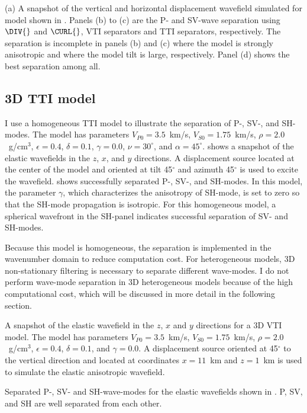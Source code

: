 
{(a) A snapshot of the vertical and horizontal displacement wavefield
simulated for model shown
in .  Panels (b) to (c) are
the P- and SV-wave separation using $\DIV{}$ and $\CURL{}$, VTI
separators and TTI separators, respectively. The separation is
incomplete in panels (b) and (c) where the model is strongly
anisotropic and where the model tilt is large, respectively. Panel (d)
shows the best separation among all.}


\subsection{3D TTI model}
I use a homogeneous TTI model to illustrate the separation of P-,
SV-, and SH-modes. The model has parameters $V_{P0}=3.5$~km/s,
$V_{S0}=1.75$~km/s, $\rho=2.0$~g/cm$^3$, $\epsilon=0.4$, $\delta=0.1$,
$\gamma=0.0$, $\nu=30^\circ$, and
$\alpha=45^\circ$.  shows a snapshot of the
elastic wavefields in the $z$, $x$, and $y$ directions. A displacement
source located at the center of the model and oriented at tilt
45$^\circ$ and azimuth 45$^\circ$ is used to excite the
wavefield.  shows successfully separated P-, SV-, and
SH-modes. In this model, the parameter $\gamma$, which characterizes
the anisotropy of SH-mode, is set to zero so that the SH-mode
propagation is isotropic. For this homogeneous model, a spherical
wavefront in the SH-panel indicates successful separation of SV- and
SH-modes.

Because this model is homogeneous, the separation is implemented in
the wavenumber domain to reduce computation cost. For heterogeneous
models, 3D non-stationary filtering is necessary to separate different
wave-modes. I do not perform wave-mode separation in 3D heterogeneous
models because of the high computational cost, which will be discussed
in more detail in the following section.




{A snapshot of the elastic wavefield in the $z$, $x$ and $y$
directions for a 3D VTI model. The model has parameters
$V_{P0}=3.5$~km/s, $V_{S0}=1.75$~km/s, $\rho=2.0$~g/cm$^3$,
$\epsilon=0.4$, $\delta=0.1$, and $\gamma=0.0$.  A displacement source
oriented at 45$^\circ$ to the vertical direction and located at
coordinates $x=11$~km and $z=1$~km is used to simulate the elastic
anisotropic wavefield.  }

{Separated P-, SV- and SH-wave-modes for the elastic wavefields shown in
.
P, SV, and SH are well separated from each other.}

